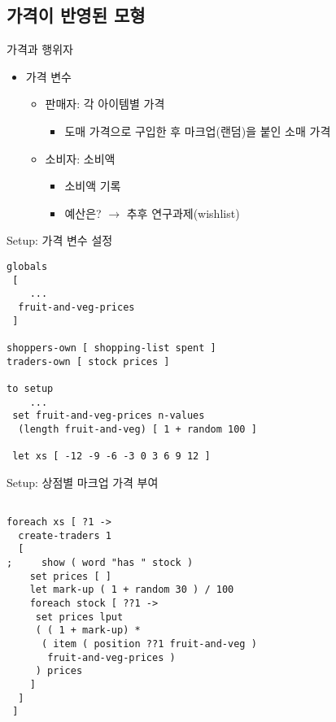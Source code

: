 \documentclass[hyperref={unicode}]{beamer}
\begin{document}
\subsection{가격이 반영된 모형}
\begin{frame}{가격과 행위자}
\begin{itemize}
\item 가격 변수
	\begin{itemize}
	\item 판매자: 각 아이템별 가격
		\begin{itemize}
		\item 도매 가격으로 구입한 후 마크업(랜덤)을 붙인 소매 가격 
		\end{itemize}
	\item 소비자: 소비액
		\begin{itemize}
		\item 소비액 기록
		\item 예산은? $\rightarrow$ 추후 연구과제(wishlist)
		\end{itemize}
	\end{itemize}	
\end{itemize}	
\end{frame}


\begin{frame}[fragile]{Setup: 가격 변수 설정}
\begin{verbatim}
globals
 [
	...
  fruit-and-veg-prices
 ] 	
 
shoppers-own [ shopping-list spent ] 
traders-own [ stock prices ] 

to setup
	...
 set fruit-and-veg-prices n-values 
  (length fruit-and-veg) [ 1 + random 100 ]
  
 let xs [ -12 -9 -6 -3 0 3 6 9 12 ]
\end{verbatim}
\end{frame}

\begin{frame}[fragile]{Setup: 상점별 마크업 가격 부여}
\begin{verbatim}
 
foreach xs [ ?1 ->
  create-traders 1
  [   
;     show ( word "has " stock )
    set prices [ ]
    let mark-up ( 1 + random 30 ) / 100
    foreach stock [ ??1 -> 
     set prices lput 
     ( ( 1 + mark-up) * 
      ( item ( position ??1 fruit-and-veg ) 
       fruit-and-veg-prices ) 
     ) prices
    ]
  ]
 ]    
 
\end{verbatim}
\end{frame}
\end{document}
